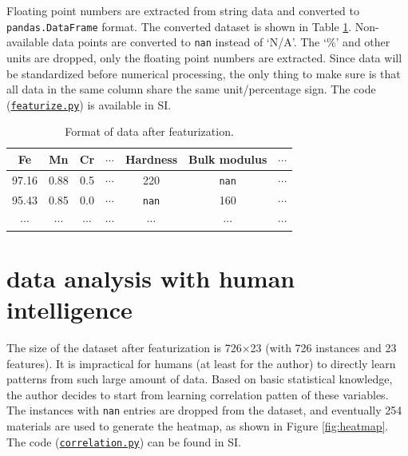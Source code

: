 \documentclass[10pt,aps,prb,amsmath,amssymb,twocolumn,letterpaper,nobalancelastpage,final,citeautoscript,floatfix,raggedbottom,superscriptaddress]{revtex4-1}
\begin{document}
Floating point numbers are extracted from string data and converted to \texttt{pandas.DataFrame} format. The converted dataset is shown in Table \ref{tab:featurization}. Non-available data points are converted to \texttt{nan} instead of `N/A'. The `\%' and other units are dropped, only the floating point numbers are extracted. Since data will be standardized before numerical processing, the only thing to make sure is that all data in the same column share the same unit/percentage sign. The code (\hyperlink{featurize}{\texttt{featurize.py}}) is available in SI.

\vspace{-10pt}
\begin{table}[h]
\begin{ruledtabular}
\caption{Format of data after featurization.\label{tab:featurization}}\centering
\begin{tabular}{ccccccc}
\sffamily Fe & \sffamily Mn & \sffamily Cr &  \sffamily $\cdots$ &  \sffamily Hardness &  \sffamily Bulk modulus &  \sffamily $\cdots$ \\
\hline 
97.16 & 0.88 & 0.5 & $\cdots$ & 220 & \texttt{nan} & $\cdots$\\
\hline
95.43 & 0.85 & 0.0 & $\cdots$ & \texttt{nan} & 160 & $\cdots$\\
\hline
$\cdots$ & $\cdots$ & $\cdots$ & $\cdots$ & $\cdots$ & $\cdots$ & $\cdots$
\end{tabular}
\end{ruledtabular}
\end{table}


\section{data analysis with human intelligence}

The size of the dataset after featurization is 726$\times$23 (with 726 instances and 23 features). It is impractical for humans (at least for the author) to directly learn patterns from such large amount of data. Based on basic statistical knowledge, the author decides to start from learning correlation patten of these variables. The instances with \texttt{nan} entries are dropped from the dataset, and eventually 254 materials are used to generate the heatmap, as shown in Figure \ref{fig:heatmap}. The code (\hyperlink{correlation}{\texttt{correlation.py}}) can be found in SI.
\end{document}
